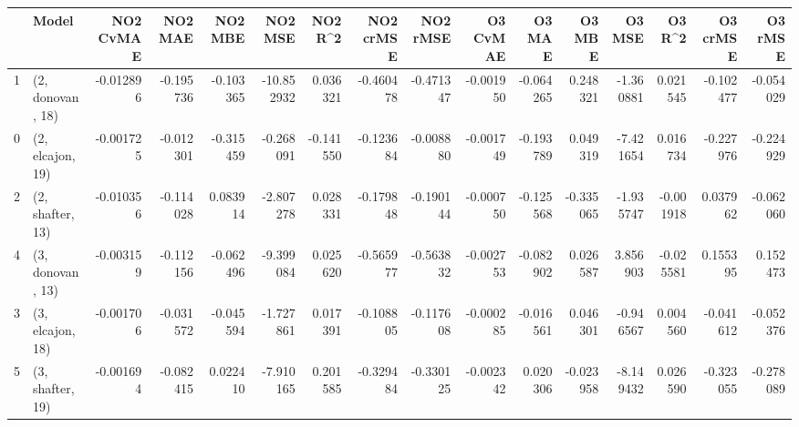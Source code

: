 \begin{tabular}{llrrrrrrrrrrrrrr}
\toprule
{} &             Model &  NO2 CvMAE &   NO2 MAE &   NO2 MBE &    NO2 MSE &   NO2 R\textasciicircum2 &  NO2 crMSE &  NO2 rMSE &  O3 CvMAE &    O3 MAE &    O3 MBE &    O3 MSE &    O3 R\textasciicircum2 &  O3 crMSE &   O3 rMSE \\
\midrule
1 &  (2, donovan, 18) &  -0.012896 & -0.195736 & -0.103365 & -10.852932 &  0.036321 &  -0.460478 & -0.471347 & -0.001950 & -0.064265 &  0.248321 & -1.360881 &  0.021545 & -0.102477 & -0.054029 \\
0 &  (2, elcajon, 19) &  -0.001725 & -0.012301 & -0.315459 &  -0.268091 & -0.141550 &  -0.123684 & -0.008880 & -0.001749 & -0.193789 &  0.049319 & -7.421654 &  0.016734 & -0.227976 & -0.224929 \\
2 &  (2, shafter, 13) &  -0.010356 & -0.114028 &  0.083914 &  -2.807278 &  0.028331 &  -0.179848 & -0.190144 & -0.000750 & -0.125568 & -0.335065 & -1.935747 & -0.001918 &  0.037962 & -0.062060 \\
4 &  (3, donovan, 13) &  -0.003159 & -0.112156 & -0.062496 &  -9.399084 &  0.025620 &  -0.565977 & -0.563832 & -0.002753 & -0.082902 &  0.026587 &  3.856903 & -0.025581 &  0.155395 &  0.152473 \\
3 &  (3, elcajon, 18) &  -0.001706 & -0.031572 & -0.045594 &  -1.727861 &  0.017391 &  -0.108805 & -0.117608 & -0.000285 & -0.016561 &  0.046301 & -0.946567 &  0.004560 & -0.041612 & -0.052376 \\
5 &  (3, shafter, 19) &  -0.001694 & -0.082415 &  0.022410 &  -7.910165 &  0.201585 &  -0.329484 & -0.330125 & -0.002342 &  0.020306 & -0.023958 & -8.149432 &  0.026590 & -0.323055 & -0.278089 \\
\bottomrule
\end{tabular}
